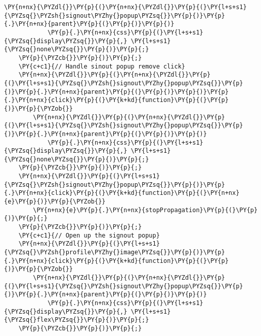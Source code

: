 \begin{Verbatim}[commandchars=\\\{\}]
        \PY{n+nx}{\PYZdl{}}\PY{p}{(}\PY{n+nx}{\PYZdl{}}\PY{p}{(}\PY{l+s+s1}{\PYZsq{}\PYZsh{}signout\PYZhy{}popup\PYZsq{}}\PY{p}{)}\PY{p}{.}\PY{n+nx}{parent}\PY{p}{(}\PY{p}{)}\PY{p}{)}
            \PY{p}{.}\PY{n+nx}{css}\PY{p}{(}\PY{l+s+s1}{\PYZsq{}display\PYZsq{}}\PY{p}{,} \PY{l+s+s1}{\PYZsq{}none\PYZsq{}}\PY{p}{)}\PY{p}{;}
    \PY{p}{\PYZcb{}}\PY{p}{)}\PY{p}{;}
    \PY{c+c1}{// Handle sinout popup remove click}
    \PY{n+nx}{\PYZdl{}}\PY{p}{(}\PY{n+nx}{\PYZdl{}}\PY{p}{(}\PY{l+s+s1}{\PYZsq{}\PYZsh{}signout\PYZhy{}popup\PYZsq{}}\PY{p}{)}\PY{p}{.}\PY{n+nx}{parent}\PY{p}{(}\PY{p}{)}\PY{p}{)}\PY{p}{.}\PY{n+nx}{click}\PY{p}{(}\PY{k+kd}{function}\PY{p}{(}\PY{p}{)}\PY{p}{\PYZob{}}
        \PY{n+nx}{\PYZdl{}}\PY{p}{(}\PY{n+nx}{\PYZdl{}}\PY{p}{(}\PY{l+s+s1}{\PYZsq{}\PYZsh{}signout\PYZhy{}popup\PYZsq{}}\PY{p}{)}\PY{p}{.}\PY{n+nx}{parent}\PY{p}{(}\PY{p}{)}\PY{p}{)}
            \PY{p}{.}\PY{n+nx}{css}\PY{p}{(}\PY{l+s+s1}{\PYZsq{}display\PYZsq{}}\PY{p}{,} \PY{l+s+s1}{\PYZsq{}none\PYZsq{}}\PY{p}{)}\PY{p}{;}
    \PY{p}{\PYZcb{}}\PY{p}{)}\PY{p}{;}
    \PY{n+nx}{\PYZdl{}}\PY{p}{(}\PY{l+s+s1}{\PYZsq{}\PYZsh{}signout\PYZhy{}popup\PYZsq{}}\PY{p}{)}\PY{p}{.}\PY{n+nx}{click}\PY{p}{(}\PY{k+kd}{function}\PY{p}{(}\PY{n+nx}{e}\PY{p}{)}\PY{p}{\PYZob{}}
        \PY{n+nx}{e}\PY{p}{.}\PY{n+nx}{stopPropagation}\PY{p}{(}\PY{p}{)}\PY{p}{;}
    \PY{p}{\PYZcb{}}\PY{p}{)}\PY{p}{;}
    \PY{c+c1}{// Open up the signout popup}
    \PY{n+nx}{\PYZdl{}}\PY{p}{(}\PY{l+s+s1}{\PYZsq{}\PYZsh{}profile\PYZhy{}image\PYZsq{}}\PY{p}{)}\PY{p}{.}\PY{n+nx}{click}\PY{p}{(}\PY{k+kd}{function}\PY{p}{(}\PY{p}{)}\PY{p}{\PYZob{}}
        \PY{n+nx}{\PYZdl{}}\PY{p}{(}\PY{n+nx}{\PYZdl{}}\PY{p}{(}\PY{l+s+s1}{\PYZsq{}\PYZsh{}signout\PYZhy{}popup\PYZsq{}}\PY{p}{)}\PY{p}{.}\PY{n+nx}{parent}\PY{p}{(}\PY{p}{)}\PY{p}{)}
            \PY{p}{.}\PY{n+nx}{css}\PY{p}{(}\PY{l+s+s1}{\PYZsq{}display\PYZsq{}}\PY{p}{,} \PY{l+s+s1}{\PYZsq{}flex\PYZsq{}}\PY{p}{)}\PY{p}{;}
    \PY{p}{\PYZcb{}}\PY{p}{)}\PY{p}{;}



\end{Verbatim}
